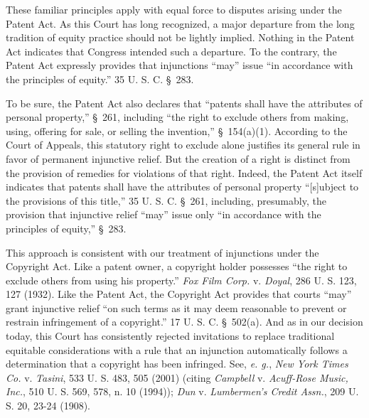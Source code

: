 These familiar principles apply with equal force to disputes arising under the
Patent Act. As this Court has long recognized, a major departure from the long
tradition of equity practice should not be lightly implied.
Nothing in the Patent Act indicates that
Congress intended such a departure. To the contrary, the Patent Act expressly
provides that injunctions ``may'' issue ``in accordance with the principles of
equity.'' 35 U. S. C. \S~283.

To be sure, the Patent Act also declares that ``patents shall have the
attributes of personal property,'' \S~261, including ``the right to
exclude others from making, using, offering for sale, or selling the
invention,'' \S~154(a)(1). According to the Court of Appeals, this
statutory right to exclude alone justifies its general rule in favor of
permanent injunctive relief. But the creation of a right is
distinct from the provision of remedies for violations of that right. Indeed,
the Patent Act itself indicates that patents shall have the attributes of
personal property ``[s]ubject to the provisions of this title,'' 35 U. S. C.
\S~261, including, presumably, the provision that injunctive relief
``may'' issue only ``in accordance with the principles of equity,''
\S~283.

This approach is consistent with our treatment of injunctions under the
Copyright Act. Like a patent owner, a copyright holder possesses ``the right to
exclude others from using his property.'' \textit{Fox Film Corp.} v.
\textit{Doyal}, 286 U. S. 123, 127 (1932).
Like the Patent Act, the Copyright Act provides that
courts ``may'' grant injunctive relief ``on such terms as it may deem reasonable
to prevent or restrain infringement of a copyright.'' 17 U. S. C. \S~502(a). And
as in our decision today, this Court has consistently rejected
invitations to replace traditional equitable considerations with a rule that an
injunction automatically follows a determination that a copyright has been
infringed. See, \textit{e. g.}, \textit{New York Times Co.} v. \textit{Tasini},
533 U. S. 483, 505 (2001) (citing \textit{Campbell} v. \textit{Acuff-Rose Music,
Inc.}, 510 U. S. 569, 578, n. 10 (1994)); \textit{Dun} v. \textit{Lumbermen's
Credit Assn.}, 209 U. S. 20, 23-24 (1908).

